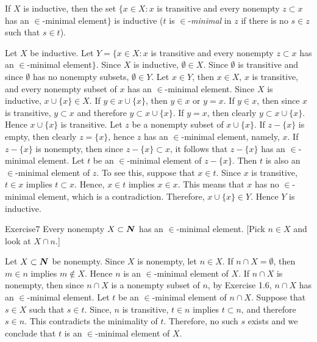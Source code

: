  If $X$ is inductive, then the set $\{ x \in X : x$
is transitive and every nonempty $z \subset x$ has an
$\in$-minimal element$\}$ is inductive ($t$ is
$\in$-\textit{minimal} in $z$ if there is no $s \in z$ such
that $s \in t$).
\begin{solution}
  Let $X$ be inductive. Let $Y = \{ x \in X : x$ is transitive and
  every nonempty $z \subset x$ has an $\in$-minimal element$\}$.
  Since $X$ is inductive, $\emptyset \in X$. Since $\emptyset$ is
  transitive and since $\emptyset$ has no nonempty subsets,
  $\emptyset \in Y$. Let $x \in Y$, then $x \in X$, $x$ is transitive,
  and every nonempty subset of $x$ has an $\in$-minimal element. Since
  $X$ is inductive, $x \cup \{ x \} \in X$. If $y \in x \cup \{ x \}$,
  then $y \in x$ or $y = x$. If $y \in x$, then since $x$ is transitive,
  $y \subset x$ and therefore $y \subset x \cup \{ x \}$. If $y = x$,
  then clearly $ y \subset x \cup \{ x \}$. Hence $x \cup \{ x \}$ is
  transitive. Let $z$ be a nonempty subset of $x \cup \{ x \}$. If 
  $z - \{ x \}$ is empty, then clearly $z = \{ x \}$, hence $z$ has an
  $\in$-minimal element, namely, $x$. If $z - \{ x \}$ is nonempty, then
  since $z - \{ x \} \subset x$, it follows that $z - \{ x \}$ has an
  $\in$-minimal element. Let $t$ be an $\in$-minimal element of
  $z - \{ x \}$. Then $t$ is also an $\in$-minimal element of $z$. To
  see this, suppose that $x \in t$. Since $x$ is transitive, $t \in x$
  implies $t \subset x$. Hence, $x \in t$ implies $x \in x$. This means
  that $x$ has no $\in$-minimal element, which is a contradiction.
  Therefore, $x \cup \{ x \} \in Y$. Hence $Y$ is inductive.
\end{solution}

Exercise{7} Every nonempty $X \subset \boldsymbol{N}$ has an $\in$-minimal element.
[Pick $n \in X$ and look at $X \cap n$.]
\begin{solution}
  Let $X \subset \boldsymbol{N}$ be nonempty. Since $X$ is nonempty, let $n \in X$.
  If $n \cap X = \emptyset$, then $m \in n$ implies $m \notin X$. Hence
  $n$ is an $\in$-minimal element of $X$. If $n \cap X$ is nonempty,
  then since $n \cap X$ is a nonempty subset of $n$, by Exercise 1.6,
  $n \cap X$ has an $\in$-minimal element. Let $t$ be an $\in$-minimal
  element of $n \cap X$. Suppose that $s \in X$ such that $s \in t$.
  Since, $n$ is transitive, $t \in n$ implies $t \subset n$, and
  therefore $s \in n$. This contradicts the minimality of $t$.
  Therefore, no such $s$ exists and we conclude that $t$ is an
  $\in$-minimal element of $X$.
  
\end{solution}